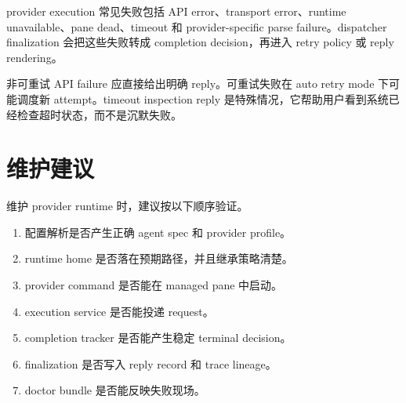 provider execution 常见失败包括 API error、transport error、runtime unavailable、pane dead、timeout 和 provider-specific parse failure。dispatcher finalization 会把这些失败转成 completion decision，再进入 retry policy 或 reply rendering。

非可重试 API failure 应直接给出明确 reply。可重试失败在 auto retry mode 下可能调度新 attempt。timeout inspection reply 是特殊情况，它帮助用户看到系统已经检查超时状态，而不是沉默失败。

\section{维护建议}

维护 provider runtime 时，建议按以下顺序验证。

\begin{enumerate}
  \item 配置解析是否产生正确 agent spec 和 provider profile。
  \item runtime home 是否落在预期路径，并且继承策略清楚。
  \item provider command 是否能在 managed pane 中启动。
  \item execution service 是否能投递 request。
  \item completion tracker 是否能产生稳定 terminal decision。
  \item finalization 是否写入 reply record 和 trace lineage。
  \item doctor bundle 是否能反映失败现场。
\end{enumerate}
